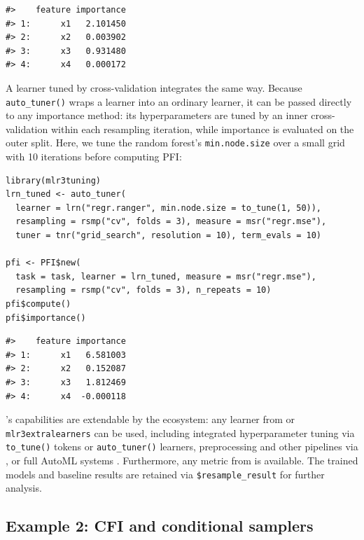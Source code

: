 \begin{verbatim}
#>    feature importance
#> 1:      x1   2.101450
#> 2:      x2   0.003902
#> 3:      x3   0.931480
#> 4:      x4   0.000172
\end{verbatim}

A learner tuned by cross-validation integrates the same way.
Because \texttt{auto\_tuner()} wraps a learner into an ordinary  learner, it can be passed directly to any importance method: its hyperparameters are tuned by an inner cross-validation within each resampling iteration, while importance is evaluated on the outer split.
Here, we tune the random forest's \texttt{min.node.size} over a small grid with 10 iterations before computing PFI:

\begin{verbatim}
library(mlr3tuning)
lrn_tuned <- auto_tuner(
  learner = lrn("regr.ranger", min.node.size = to_tune(1, 50)),
  resampling = rsmp("cv", folds = 3), measure = msr("regr.mse"),
  tuner = tnr("grid_search", resolution = 10), term_evals = 10)

pfi <- PFI$new(
  task = task, learner = lrn_tuned, measure = msr("regr.mse"),
  resampling = rsmp("cv", folds = 3), n_repeats = 10)
pfi$compute()
pfi$importance()
\end{verbatim}

\begin{verbatim}
#>    feature importance
#> 1:      x1   6.581003
#> 2:      x2   0.152087
#> 3:      x3   1.812469
#> 4:      x4  -0.000118
\end{verbatim}

's capabilities are extendable by the  ecosystem: any learner from  or \texttt{mlr3extralearners} \citep{fischer2025mlr3extralearnersexpanding} can be used, including integrated hyperparameter tuning via \texttt{to\_tune()} tokens or \texttt{auto\_tuner()} learners, preprocessing and other pipelines via , or full AutoML systems \citep{mlr3bookadvancedtuning, mlr3bookpipelinestuning}.
Furthermore, any metric from  is available.
The trained models and baseline results are retained via \texttt{\$resample\_result} for further analysis.

\subsection{Example 2: CFI and conditional samplers}\label{example-2-cfi-and-conditional-samplers}

